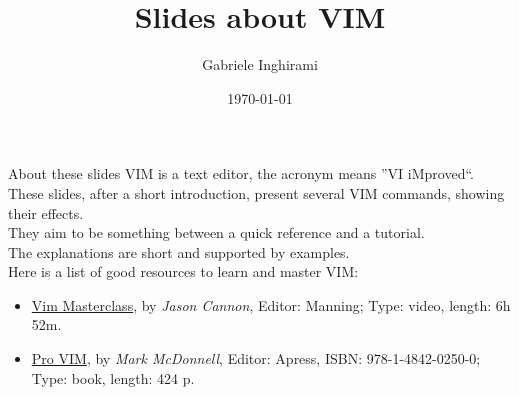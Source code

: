 

    
    \author[Gabriele Inghirami]{Gabriele Inghirami}
    \title[Slides about VIM]{Slides about VIM}
    \date{\today}
    \maketitle
    
    \begin{frame}{About these slides}
    VIM is a text editor, the acronym means ''VI iMproved``.\\
    These slides, after a short introduction, present several VIM commands, showing their effects.\\
    They aim to be something between a quick reference and a tutorial.\\
    The explanations are short and supported by examples.\\
    Here is a list of good resources to learn and master VIM:
    \begin{itemize}
        \item \href{https://www.manning.com/livevideo/vim-masterclass}{Vim Masterclass}, by \emph{Jason Cannon}, Editor: Manning;  Type: video, length: 6h 52m.
        \item \href{https://link.springer.com/book/10.1007/978-1-4842-0250-0}{Pro VIM}, by \emph{Mark McDonnell}, Editor: Apress, ISBN: 978-1-4842-0250-0; Type: book, length: 424 p.
    \end{itemize}
    \end{frame}
    
     

